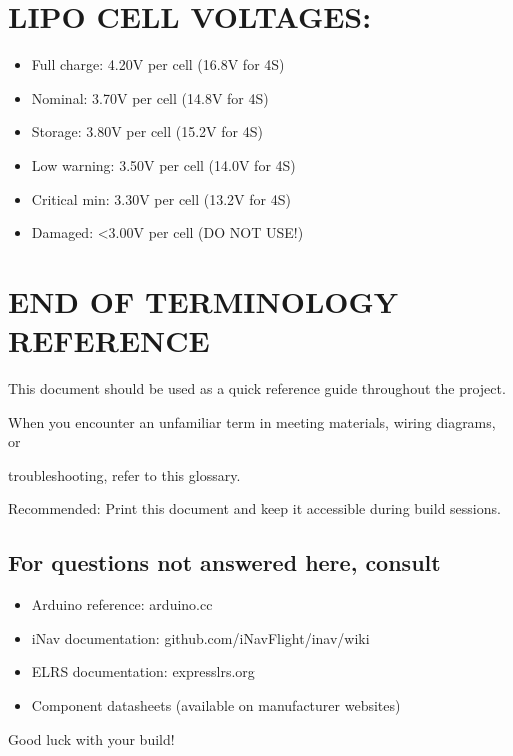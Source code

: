 \documentclass[11pt,letterpaper]{article}
\begin{document}
\section{LIPO CELL VOLTAGES:}

\begin{itemize}
  \item Full charge:    4.20V per cell (16.8V for 4S)
  \item Nominal:        3.70V per cell (14.8V for 4S)
  \item Storage:        3.80V per cell (15.2V for 4S)
  \item Low warning:    3.50V per cell (14.0V for 4S)
  \item Critical min:   3.30V per cell (13.2V for 4S)
  \item Damaged:        <3.00V per cell (DO NOT USE!)
\end{itemize}

\section{END OF TERMINOLOGY REFERENCE}

This document should be used as a quick reference guide throughout the project.\par

When you encounter an unfamiliar term in meeting materials, wiring diagrams, or\par

troubleshooting, refer to this glossary.\par

Recommended: Print this document and keep it accessible during build sessions.\par

\subsection{For questions not answered here, consult}

\begin{itemize}
  \item Arduino reference: arduino.cc
  \item iNav documentation: github.com/iNavFlight/inav/wiki
  \item ELRS documentation: expresslrs.org
  \item Component datasheets (available on manufacturer websites)
\end{itemize}

Good luck with your build!\par
\end{document}
